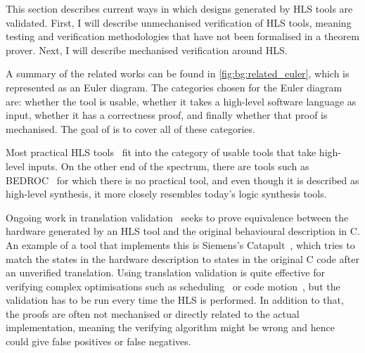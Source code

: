 This section describes current ways in which designs generated by \gls{HLS}
tools are validated.  First, I will describe unmechanised verification of
\gls{HLS} tools, meaning testing and verification methodologies that have not
been formalised in a theorem prover.  Next, I will describe mechanised
verification around \gls{HLS}.

A summary of the related works can be found in \cref{fig:bg:related_euler},
which is represented as an Euler diagram.  The categories chosen for the Euler
diagram are: whether the tool is usable, whether it takes a high-level software
language as input, whether it has a correctness proof, and finally whether that
proof is mechanised.  The goal of \vericert{} is to cover all of these
categories.

Most practical \gls{HLS} tools~\cite{canis13_l, amd23_vitis_high_synth,
  intel20_sdk_openc_applic, nigam20_predic_accel_desig_time_sensit_affin_types}
fit into the category of usable tools that take high-level inputs.  On the other
end of the spectrum, there are tools such as
BEDROC~\cite{chapman92_verif_bedroc} for which there is no practical tool, and
even though it is described as high-level synthesis, it more closely resembles
today's logic synthesis tools.

Ongoing work in translation validation~\cite{pnueli98_trans} seeks to prove
equivalence between the hardware generated by an HLS tool and the original
behavioural description in C.  An example of a tool that implements this is
Siemens's Catapult~\cite{mentor20_catap_high_level_synth}, which tries to match
the states in the hardware description to states in the original C code after an
unverified translation.  Using translation validation is quite effective for
verifying complex optimisations such as scheduling~\cite{kim04_autom_fsmd,
  karfa06_formal_verif_method_sched_high_synth,
  chouksey20_verif_sched_condit_behav_high_level_synth} or code
motion~\cite{banerjee14_verif_code_motion_techn_using_value_propag,
  chouksey19_trans_valid_code_motion_trans_invol_loops}, but the validation has
to be run every time the HLS is performed.  In addition to that, the proofs are
often not mechanised or directly related to the actual implementation, meaning
the verifying algorithm might be wrong and hence could give false positives or
false negatives.

